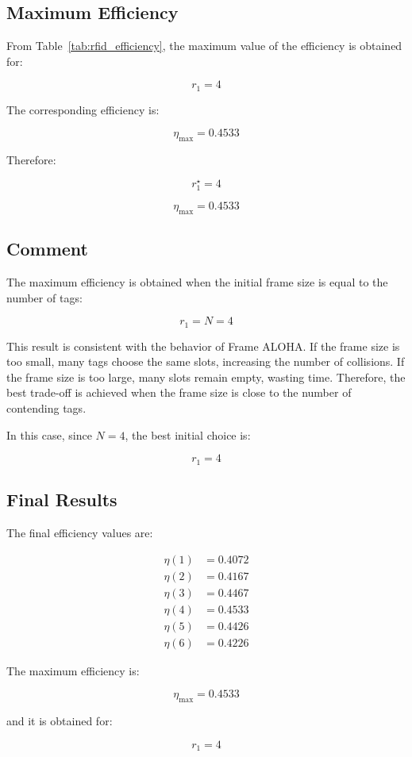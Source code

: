 \documentclass[a4paper,12pt]{article}
\begin{document}
\subsection{Maximum Efficiency}

From Table~\ref{tab:rfid_efficiency}, the maximum value of the efficiency is obtained for:

\[
r_1 = 4
\]

The corresponding efficiency is:

\[
\eta_{\max} = 0.4533
\]

Therefore:

\[
\boxed{r_1^{\star}=4}
\]

\[
\boxed{\eta_{\max}=0.4533}
\]

\subsection{Comment}

The maximum efficiency is obtained when the initial frame size is equal to the number of tags:

\[
r_1 = N = 4
\]

This result is consistent with the behavior of Frame ALOHA. If the frame size is too small, many tags choose the same slots, increasing the number of collisions. If the frame size is too large, many slots remain empty, wasting time. Therefore, the best trade-off is achieved when the frame size is close to the number of contending tags.

In this case, since \(N=4\), the best initial choice is:

\[
\boxed{r_1 = 4}
\]

\subsection{Final Results}

The final efficiency values are:

\[
\boxed{
\begin{aligned}
\eta(1) &= 0.4072 \\
\eta(2) &= 0.4167 \\
\eta(3) &= 0.4467 \\
\eta(4) &= 0.4533 \\
\eta(5) &= 0.4426 \\
\eta(6) &= 0.4226
\end{aligned}
}
\]

The maximum efficiency is:

\[
\boxed{\eta_{\max}=0.4533}
\]

and it is obtained for:

\[
\boxed{r_1=4}
\]
\end{document}
